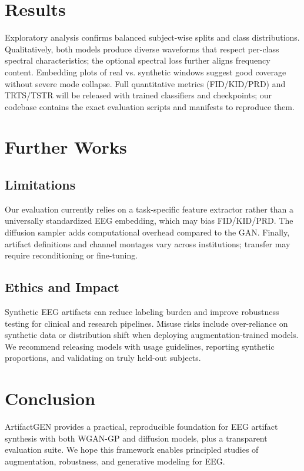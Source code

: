 \documentclass{article}
\begin{document}

\section{Results}
Exploratory analysis confirms balanced subject-wise splits and class distributions. Qualitatively, both models produce diverse waveforms that respect per-class spectral characteristics; the optional spectral loss further aligns frequency content. Embedding plots of real vs. synthetic windows suggest good coverage without severe mode collapse. Full quantitative metrics (FID/KID/PRD) and TRTS/TSTR will be released with trained classifiers and checkpoints; our codebase contains the exact evaluation scripts and manifests to reproduce them.

\section{Further Works}

\subsection{Limitations}
Our evaluation currently relies on a task-specific feature extractor rather than a universally standardized EEG embedding, which may bias FID/KID/PRD. The diffusion sampler adds computational overhead compared to the GAN. Finally, artifact definitions and channel montages vary across institutions; transfer may require reconditioning or fine-tuning.

\subsection{Ethics and Impact}
Synthetic EEG artifacts can reduce labeling burden and improve robustness testing for clinical and research pipelines. Misuse risks include over-reliance on synthetic data or distribution shift when deploying augmentation-trained models. We recommend releasing models with usage guidelines, reporting synthetic proportions, and validating on truly held-out subjects.


\section{Conclusion}
ArtifactGEN provides a practical, reproducible foundation for EEG artifact synthesis with both WGAN-GP and diffusion models, plus a transparent evaluation suite. We hope this framework enables principled studies of augmentation, robustness, and generative modeling for EEG.




\small


\end{document}
